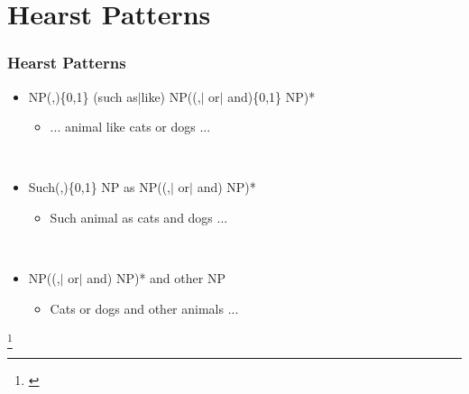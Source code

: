 \section{Hearst Patterns}
\label{sec:hearst-patterns}

\begin{frame}
  \frametitle{Hearst Patterns}

  \begin{itemize}
  \item NP(,)\{0,1\} (such as$\vert$like)
    NP((,$\vert$ or$\vert$ and)\{0,1\} NP)*
    \begin{itemize}
    \item ... animal like cats or dogs ...
    \end{itemize}~\\

  \item Such(,)\{0,1\} NP as NP((,$\vert$ or$\vert$ and) NP)*
    \begin{itemize}
    \item Such animal as cats and dogs ...
    \end{itemize}~\\

  \item NP((,$\vert$ or$\vert$ and) NP)* and  other NP
    \begin{itemize}
    \item Cats or dogs and other animals ...
    \end{itemize}

  \end{itemize}

  \let\thefootnote\relax\footnote{\cite{Hearst:1992}}
\end{frame}
